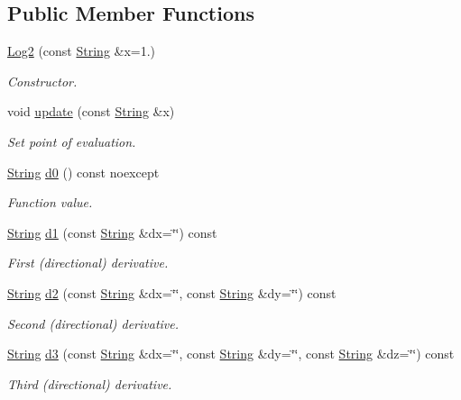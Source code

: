 \subsection*{Public Member Functions}
\begin{DoxyCompactItemize}
\item 
\hyperlink{structFunG_1_1stringify_1_1Log2_a64e1c5864ddabea2de35eeacb5a3a781}{Log2} (const \hyperlink{structFunG_1_1String}{String} \&x=1.)
\begin{DoxyCompactList}\small\item\em Constructor. \end{DoxyCompactList}\item 
void \hyperlink{structFunG_1_1stringify_1_1Log2_a3fdba6e97994996105a2ced9c8cb6575}{update} (const \hyperlink{structFunG_1_1String}{String} \&x)
\begin{DoxyCompactList}\small\item\em Set point of evaluation. \end{DoxyCompactList}\item 
\hyperlink{structFunG_1_1String}{String} \hyperlink{structFunG_1_1stringify_1_1Log2_ac2b99239ab1fa58077853930615a3b96}{d0} () const noexcept
\begin{DoxyCompactList}\small\item\em Function value. \end{DoxyCompactList}\item 
\hyperlink{structFunG_1_1String}{String} \hyperlink{structFunG_1_1stringify_1_1Log2_aade5c01ef99067ef42d528e6e652e1c4}{d1} (const \hyperlink{structFunG_1_1String}{String} \&dx=\char`\"{}\char`\"{}) const 
\begin{DoxyCompactList}\small\item\em First (directional) derivative. \end{DoxyCompactList}\item 
\hyperlink{structFunG_1_1String}{String} \hyperlink{structFunG_1_1stringify_1_1Log2_a090dcd90c696cd0e270ace14c734fd44}{d2} (const \hyperlink{structFunG_1_1String}{String} \&dx=\char`\"{}\char`\"{}, const \hyperlink{structFunG_1_1String}{String} \&dy=\char`\"{}\char`\"{}) const 
\begin{DoxyCompactList}\small\item\em Second (directional) derivative. \end{DoxyCompactList}\item 
\hyperlink{structFunG_1_1String}{String} \hyperlink{structFunG_1_1stringify_1_1Log2_ae55315a95d2555333aa6b9b2be59edeb}{d3} (const \hyperlink{structFunG_1_1String}{String} \&dx=\char`\"{}\char`\"{}, const \hyperlink{structFunG_1_1String}{String} \&dy=\char`\"{}\char`\"{}, const \hyperlink{structFunG_1_1String}{String} \&dz=\char`\"{}\char`\"{}) const 
\begin{DoxyCompactList}\small\item\em Third (directional) derivative. \end{DoxyCompactList}\end{DoxyCompactItemize}


